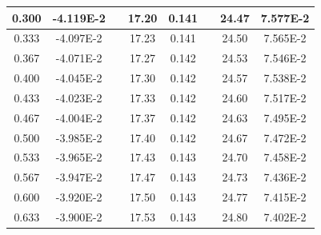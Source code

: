 \documentclass[article,12pt]{elsarticle}
\begin{document}
\begin{longtable}[c]{|c|c|cccccc}
0.300    & -4.119E-2 & \multicolumn{1}{c|}{} & \multicolumn{1}{c|}{17.20}   & \multicolumn{1}{c|}{0.141} & \multicolumn{1}{c|}{} & \multicolumn{1}{c|}{24.47}   & \multicolumn{1}{c|}{7.577E-2} \\ \hline
0.333    & -4.097E-2 & \multicolumn{1}{c|}{} & \multicolumn{1}{c|}{17.23}   & \multicolumn{1}{c|}{0.141} & \multicolumn{1}{c|}{} & \multicolumn{1}{c|}{24.50}   & \multicolumn{1}{c|}{7.565E-2} \\ \hline
0.367    & -4.071E-2 & \multicolumn{1}{c|}{} & \multicolumn{1}{c|}{17.27}   & \multicolumn{1}{c|}{0.142} & \multicolumn{1}{c|}{} & \multicolumn{1}{c|}{24.53}   & \multicolumn{1}{c|}{7.546E-2} \\ \hline
0.400    & -4.045E-2 & \multicolumn{1}{c|}{} & \multicolumn{1}{c|}{17.30}   & \multicolumn{1}{c|}{0.142} & \multicolumn{1}{c|}{} & \multicolumn{1}{c|}{24.57}   & \multicolumn{1}{c|}{7.538E-2} \\ \hline
0.433    & -4.023E-2 & \multicolumn{1}{c|}{} & \multicolumn{1}{c|}{17.33}   & \multicolumn{1}{c|}{0.142} & \multicolumn{1}{c|}{} & \multicolumn{1}{c|}{24.60}   & \multicolumn{1}{c|}{7.517E-2} \\ \hline
0.467    & -4.004E-2 & \multicolumn{1}{c|}{} & \multicolumn{1}{c|}{17.37}   & \multicolumn{1}{c|}{0.142} & \multicolumn{1}{c|}{} & \multicolumn{1}{c|}{24.63}   & \multicolumn{1}{c|}{7.495E-2} \\ \hline
0.500    & -3.985E-2 & \multicolumn{1}{c|}{} & \multicolumn{1}{c|}{17.40}   & \multicolumn{1}{c|}{0.142} & \multicolumn{1}{c|}{} & \multicolumn{1}{c|}{24.67}   & \multicolumn{1}{c|}{7.472E-2} \\ \hline
0.533    & -3.965E-2 & \multicolumn{1}{c|}{} & \multicolumn{1}{c|}{17.43}   & \multicolumn{1}{c|}{0.143} & \multicolumn{1}{c|}{} & \multicolumn{1}{c|}{24.70}   & \multicolumn{1}{c|}{7.458E-2} \\ \hline
0.567    & -3.947E-2 & \multicolumn{1}{c|}{} & \multicolumn{1}{c|}{17.47}   & \multicolumn{1}{c|}{0.143} & \multicolumn{1}{c|}{} & \multicolumn{1}{c|}{24.73}   & \multicolumn{1}{c|}{7.436E-2} \\ \hline
0.600    & -3.920E-2 & \multicolumn{1}{c|}{} & \multicolumn{1}{c|}{17.50}   & \multicolumn{1}{c|}{0.143} & \multicolumn{1}{c|}{} & \multicolumn{1}{c|}{24.77}   & \multicolumn{1}{c|}{7.415E-2} \\ \hline
0.633    & -3.900E-2 & \multicolumn{1}{c|}{} & \multicolumn{1}{c|}{17.53}   & \multicolumn{1}{c|}{0.143} & \multicolumn{1}{c|}{} & \multicolumn{1}{c|}{24.80}   & \multicolumn{1}{c|}{7.402E-2} \\ \hline

\end{longtable}
\end{document}
